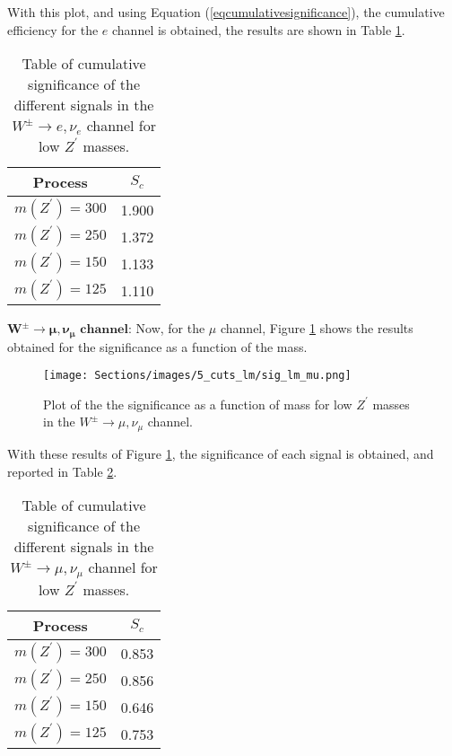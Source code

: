 With this plot, and using Equation (\ref{eqcumulativesignificance}), the cumulative efficiency for the $e$ channel is obtained, the results are shown in Table \ref{Table_cumulative_sig_lm_e}.

\begin{table}[ht!]
\centering
\caption{Table of cumulative significance of the different signals in the $W^{\pm} \rightarrow e, \nu_e$ channel for low $Z^{\prime}$ masses.}
\label{Table_cumulative_sig_lm_e}
\begin{tabular}{c|c}
\hline
\hline
Process & $S_c$ \\
\hline
$m(Z^{\prime}) = 300$ & 1.900 \\
$m(Z^{\prime}) = 250$ & 1.372 \\
$m(Z^{\prime}) = 150$ & 1.133 \\
$m(Z^{\prime}) = 125$ & 1.110 \\
\hline
\hline
\end{tabular}
\end{table}

$\bm{W^{\pm} \rightarrow \mu, \nu_{\mu}} \textbf{ channel:}$ Now, for the $\mu$ channel, Figure \ref{Sig_lm_mu} shows the results obtained for the significance as a function of the mass.

\begin{figure}[ht!]
    \centering
    \texttt{[image: Sections/images/5\_cuts\_lm/sig\_lm\_mu.png]}
    \caption{Plot of the the significance as a function of mass for low $Z^{\prime}$ masses in the $W^{\pm}\rightarrow \mu, \nu_{\mu}$ channel.}
    \label{Sig_lm_mu}
\end{figure}

With these results of Figure \ref{Sig_lm_mu}, the significance of each signal is obtained, and reported in Table \ref{Table_cumulative_sig_lm_mu}.

\begin{table}[ht!]
\centering
\caption{Table of cumulative significance of the different signals in the $W^{\pm} \rightarrow \mu, \nu_{\mu}$ channel for low $Z^{\prime}$ masses.}
\label{Table_cumulative_sig_lm_mu}
\begin{tabular}{c|c}
\hline
\hline
Process & $S_c$ \\
\hline
$m(Z^{\prime}) = 300$ & 0.853 \\
$m(Z^{\prime}) = 250$ & 0.856 \\
$m(Z^{\prime}) = 150$ & 0.646 \\
$m(Z^{\prime}) = 125$ & 0.753 \\
\hline
\hline
\end{tabular}
\end{table}

